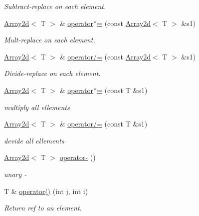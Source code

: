 \begin{DoxyCompactItemize}
\begin{DoxyCompactList}\small\item\em Subtract-\/replace on each element. \end{DoxyCompactList}\item 
\mbox{\hyperlink{classXMLArray_1_1Array2d}{Array2d}}$<$ T $>$ \& \mbox{\hyperlink{classXMLArray_1_1Array2d_a591d1e6e7de9fd024657bb6e9264a89b}{operator$\ast$=}} (const \mbox{\hyperlink{classXMLArray_1_1Array2d}{Array2d}}$<$ T $>$ \&s1)
\begin{DoxyCompactList}\small\item\em Mult-\/replace on each element. \end{DoxyCompactList}\item 
\mbox{\hyperlink{classXMLArray_1_1Array2d}{Array2d}}$<$ T $>$ \& \mbox{\hyperlink{classXMLArray_1_1Array2d_a704df3d7442ab68977e0caa8f8f059cd}{operator/=}} (const \mbox{\hyperlink{classXMLArray_1_1Array2d}{Array2d}}$<$ T $>$ \&s1)
\begin{DoxyCompactList}\small\item\em Divide-\/replace on each element. \end{DoxyCompactList}\item 
\mbox{\hyperlink{classXMLArray_1_1Array2d}{Array2d}}$<$ T $>$ \& \mbox{\hyperlink{classXMLArray_1_1Array2d_aee0e6a53c2f9dcc263ba59286d359b38}{operator$\ast$=}} (const T \&s1)
\begin{DoxyCompactList}\small\item\em multiply all ellements \end{DoxyCompactList}\item 
\mbox{\hyperlink{classXMLArray_1_1Array2d}{Array2d}}$<$ T $>$ \& \mbox{\hyperlink{classXMLArray_1_1Array2d_aa699e2de82efb77e8e5e875a63eb7d8b}{operator/=}} (const T \&s1)
\begin{DoxyCompactList}\small\item\em devide all ellements \end{DoxyCompactList}\item 
\mbox{\hyperlink{classXMLArray_1_1Array2d}{Array2d}}$<$ T $>$ \mbox{\hyperlink{classXMLArray_1_1Array2d_a650034573254ebdd7c914d68a498e2c9}{operator-\/}} ()
\begin{DoxyCompactList}\small\item\em unary -\/ \end{DoxyCompactList}\item 
T \& \mbox{\hyperlink{classXMLArray_1_1Array2d_ab8618dbef1cc6b94b3345ce3da0ad996}{operator()}} (int j, int i)
\begin{DoxyCompactList}\small\item\em Return ref to an element. \end{DoxyCompactList}\item 

\end{DoxyCompactItemize}
